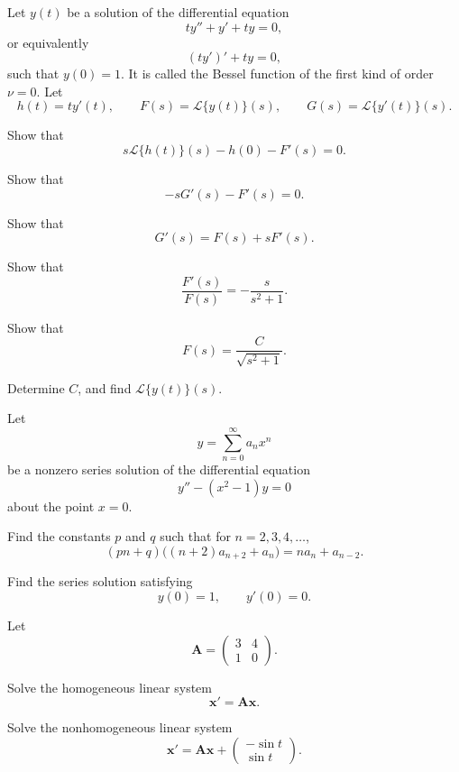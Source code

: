 \begin{problem}
Let $y(t)$ be a solution of the differential equation
\[
ty''+y'+ty=0,
\]
or equivalently
\[
(ty')'+ty=0,
\]
such that $y(0)=1$. It is called the Bessel function of the first kind of order $\nu=0$. Let
\[
h(t)=ty'(t),
\qquad
F(s)=\mathcal{L}\{y(t)\}(s),
\qquad
G(s)=\mathcal{L}\{y'(t)\}(s).
\]
\begin{problemsubparts}
\item Show that
\[
s\mathcal{L}\{h(t)\}(s)-h(0)-F'(s)=0.
\]
\item Show that
\[
-sG'(s)-F'(s)=0.
\]
\item Show that
\[
G'(s)=F(s)+sF'(s).
\]
\item Show that
\[
\frac{F'(s)}{F(s)}=-\frac{s}{s^2+1}.
\]
\item Show that
\[
F(s)=\frac{C}{\sqrt{s^2+1}}.
\]
\item Determine $C$, and find $\mathcal{L}\{y(t)\}(s)$.
\end{problemsubparts}
\end{problem}

\begin{problem}
Let
\[
y=\sum_{n=0}^{\infty}a_nx^n
\]
be a nonzero series solution of the differential equation
\[
y''-(x^2-1)y=0
\]
about the point $x=0$.
\begin{problemsubparts}
\item Find the constants $p$ and $q$ such that for $n=2,3,4,\dots$,
\[
(pn+q)\bigl((n+2)a_{n+2}+a_n\bigr)=na_n+a_{n-2}.
\]
\item Find the series solution satisfying
\[
y(0)=1,
\qquad
y'(0)=0.
\]
\end{problemsubparts}
\end{problem}

\begin{problem}
Let
\[
\mathbf A=
\begin{pmatrix}
3&4\\
1&0
\end{pmatrix}.
\]
\begin{problemsubparts}
\item Solve the homogeneous linear system
\[
\mathbf x'=\mathbf A\mathbf x.
\]
\item Solve the nonhomogeneous linear system
\[
\mathbf x'=\mathbf A\mathbf x+
\begin{pmatrix}
-\sin t\\
\sin t
\end{pmatrix}.
\]
\end{problemsubparts}
\end{problem}

